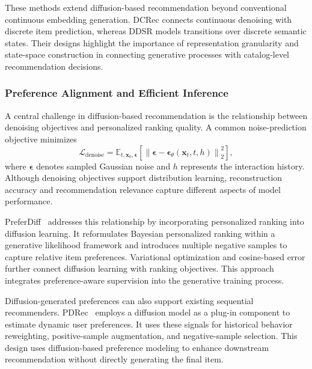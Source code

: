\documentclass[sigconf,nonacm]{acmart}
\begin{document}
These methods extend diffusion-based recommendation
beyond conventional continuous embedding
generation. DCRec connects continuous denoising
with discrete item prediction, whereas DDSR
models transitions over discrete semantic states.
Their designs highlight the importance of
representation granularity and state-space
construction in connecting generative processes
with catalog-level recommendation decisions.

\subsubsection{Preference Alignment and Efficient Inference}

A central challenge in diffusion-based recommendation
is the relationship between denoising objectives
and personalized ranking quality. A common
noise-prediction objective minimizes
\begin{equation}
    \mathcal{L}_{\mathrm{denoise}}
    =
    \mathbb{E}_{t,\mathbf{x}_0,\boldsymbol{\epsilon}}
    \left[
    \left\|
    \boldsymbol{\epsilon}
    -
    \boldsymbol{\epsilon}_{\theta}
    (\mathbf{x}_t,t,h)
    \right\|_2^2
    \right],
    \label{eq:diffusion_denoise}
\end{equation}
where $\boldsymbol{\epsilon}$ denotes sampled
Gaussian noise and $h$ represents the
interaction history. Although denoising
objectives support distribution learning,
reconstruction accuracy and recommendation
relevance capture different aspects of
model performance.

PreferDiff~\cite{preferdiff} addresses this
relationship by incorporating personalized
ranking into diffusion learning. It reformulates
Bayesian personalized ranking within a
generative likelihood framework and introduces
multiple negative samples to capture relative
item preferences. Variational optimization
and cosine-based error further connect
diffusion learning with ranking objectives.
This approach integrates preference-aware
supervision into the generative training
process.

Diffusion-generated preferences can also
support existing sequential recommenders.
PDRec~\cite{pdrec} employs a diffusion model
as a plug-in component to estimate dynamic
user preferences. It uses these signals
for historical behavior reweighting,
positive-sample augmentation, and
negative-sample selection. This design
uses diffusion-based preference modeling to
enhance downstream recommendation
without directly generating the final item.
\end{document}
